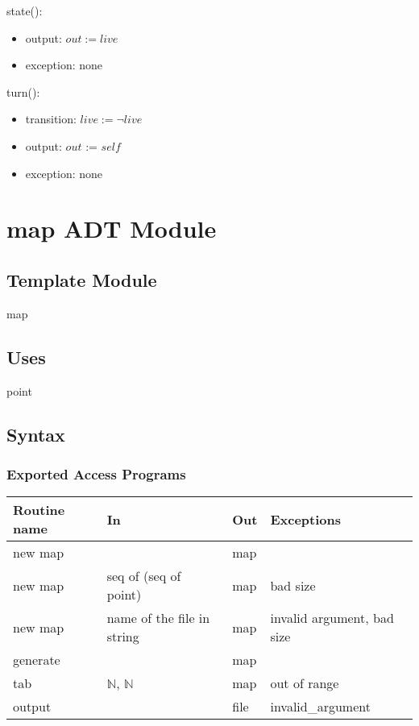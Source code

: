 \documentclass[12pt]{article}
\begin{document}
\noindent state():
\begin{itemize}
\item output: $out := live$ 
\item exception: none
\end{itemize}



\noindent turn():
\begin{itemize}
\item transition: $live := \lnot live$
\item output: $out$ := $self$
\item exception: none
\end{itemize}


\newpage

\section* {map ADT Module}

\subsection*{Template Module}

map

\subsection* {Uses}

\noindent point

\subsection* {Syntax}

\subsubsection* {Exported Access Programs}

\begin{tabular}{| l | l | l | l |}
\hline
\textbf{Routine name} & \textbf{In} & \textbf{Out} & \textbf{Exceptions}\\
\hline
new map  &  & map &\\
\hline
new map  & seq of (seq of point) & map & bad size\\
\hline
new map & name of the file in string  & map & invalid argument, bad size\\
\hline
generate &  & map & \\
\hline
tab &$\mathbb{N}$, $\mathbb{N}$  &  map & out of range \\
\hline
output  & & file & invalid\_argument\\
\hline

\end{tabular}
\end{document}
